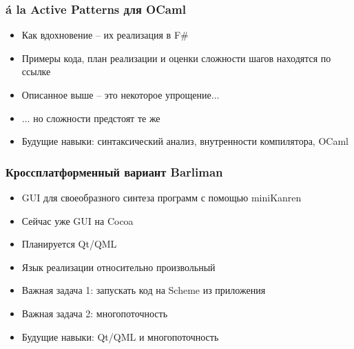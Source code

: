 \documentclass{beamer}
\begin{document}

\begin{frame}[fragile]
  \transwipe[direction=90]
  \frametitle{á la Active Patterns для OCaml}
  \begin{itemize}
    \item Как вдохновение -- их реализация в F\#
    \item Примеры кода, план реализации и оценки сложности шагов находятся по ссылке
			\href{https://github.com/ocamllabs/compiler-hacking/wiki/Add-a-%22with%22-syntax-for-patterns}
          {}
		\item Описанное выше -- это некоторое упрощение...
		\item ... но сложности предстоят те же
		\item Будущие навыки: синтаксический анализ, внутренности компилятора, OCaml
  \end{itemize}
\end{frame}

\begin{frame}[fragile]
  \transwipe[direction=90]
  \frametitle{Кроссплатформенный вариант Barliman}

  \begin{itemize}
    \item GUI для своеобразного синтеза программ с помощью miniKanren
    \item Сейчас уже \href{https://github.com/webyrd/Barliman}{} GUI на Cocoa
    \item Планируется Qt/QML 
    \item Язык реализации относительно произвольный
    \item Важная задача 1: запускать код на Scheme из приложения
    \item Важная задача 2: многопоточность
    \item Будущие навыки: Qt/QML и многопоточность
  \end{itemize}
\end{frame}
\end{document}
